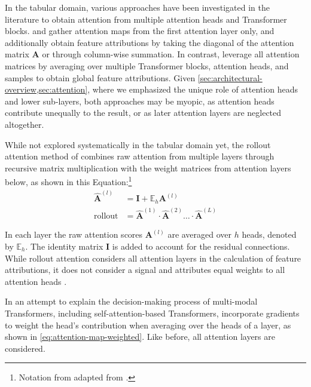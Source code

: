 In the tabular domain, various approaches have been investigated in the literature to obtain attention from multiple attention heads and Transformer blocks. \textcite[\checkmark][18]{somepalliSaintImprovedNeural2021} and \textcite[\checkmark][8]{borisovDeepNeuralNetworks2022} gather attention maps from the first attention layer only, and \textcite[\checkmark][8]{borisovDeepNeuralNetworks2022} additionally obtain feature attributions by taking the diagonal of the attention matrix $\mathbf{A}$ or through column-wise summation. In contrast, \textcite[\checkmark][18941]{gorishniyRevisitingDeepLearning2021} leverage all attention matrices by averaging over multiple Transformer blocks, attention heads, and samples to obtain global feature attributions. Given \cref{sec:architectural-overview,sec:attention}, where we emphasized the unique role of attention heads and lower sub-layers, both approaches may be myopic, as attention heads contribute unequally to the result, or as later attention layers are neglected altogether.

While not explored systematically in the tabular domain yet, the rollout attention method of \textcite[\checkmark][4192]{abnarQuantifyingAttentionFlow2020} combines raw attention from multiple layers through recursive matrix multiplication with the weight matrices from attention layers below, as shown in this Equation:\footnote{Notation from adapted from \textcite[\checkmark][786]{cheferTransformerInterpretabilityAttention2021}.}
\begin{equation}
    \begin{aligned}
        \hat{\mathbf{A}}^{(l)}    & =\mathbf{I}+\mathbb{E}_h \mathbf{A}^{(l)}                                              \\
        \operatorname { rollout } & =\hat{\mathbf{A}}^{(1)} \cdot \hat{\mathbf{A}}^{(2)} \ldots\cdot\hat{\mathbf{A}}^{(L)}
    \end{aligned}
    \label{eq:attention-map-rollout}
\end{equation}

In each layer the raw attention scores $\mathbf{A}^{(l)}$ are averaged over $h$ heads, denoted by $\mathbb{E}_h$. The identity matrix $\mathbf{I}$ is added to account for the residual connections. While rollout attention considers all attention layers in the calculation of feature attributions, it does not consider a signal and attributes equal weights to all attention heads \autocite[\checkmark][786]{cheferTransformerInterpretabilityAttention2021}.

In an attempt to explain the decision-making process of multi-modal Transformers, including self-attention-based Transformers, \textcite[\checkmark][399]{cheferGenericAttentionmodelExplainability2021} incorporate gradients to weight the head's contribution when averaging over the heads of a layer, as shown in \cref{eq:attention-map-weighted}. Like before, all attention layers are considered.

